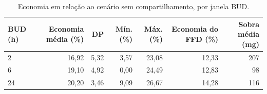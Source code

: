 \begin{table}[H]
\centering
\caption{Economia em relação ao cenário sem compartilhamento, por janela BUD.}\label{tab:economia_bud}
\small
\begin{tabular}{@{}lrrrrrr@{}}
\toprule
\textbf{BUD (h)} & \textbf{Economia média (\%)} & \textbf{DP} & \textbf{Mín. (\%)} & \textbf{Máx. (\%)} & \textbf{Economia do FFD (\%)} & \textbf{Sobra média (mg)} \\
\midrule
2 & 16,92 & 5,32 & 3,57 & 23,08 & 12,33 & 207 \\
6 & 19,10 & 4,92 & 0,00 & 24,49 & 12,83 & 98 \\
24 & 20,20 & 3,46 & 9,09 & 26,67 & 14,28 & 116 \\
\bottomrule
\end{tabular}
\end{table}
